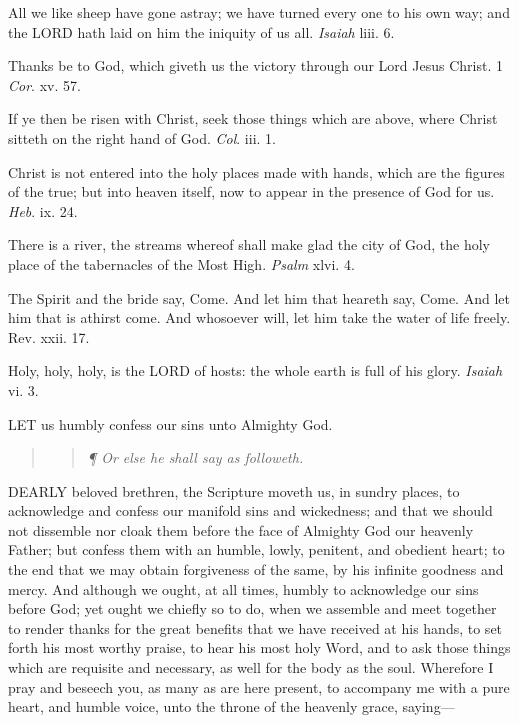 All
we like sheep have gone astray; we have turned every one to his own way;
and the LORD hath laid on him the iniquity of us
all. \emph{Isaiah} liii. 6.

Thanks be to God, which giveth us the victory through our Lord Jesus Christ.
1 \emph{Cor}. xv. 57.

If ye then be risen with Christ, seek those things
which are above, where Christ sitteth on the right hand of God. \emph{Col}.
iii. 1. 

Christ is not entered into the holy places made with hands, which are
the figures of the true; but into heaven itself, now to appear in the
presence of God for us. \emph{Heb}. ix. 24.

There is a river, the streams whereof shall make glad the city of God,
the holy place of the tabernacles of the Most High. \emph{Psalm}
xlvi. 4. 

The
Spirit and the bride say, Come. And let him that heareth say, Come. And
let him that is athirst come. And whosoever will, let him take the water
of life freely. Rev. xxii. 17.

Holy, holy, holy, is the LORD of hosts: the whole
earth is full of his glory. \emph{Isaiah} vi. 3.

LET
us humbly confess our sins unto Almighty God.

\begin{quote}

\begin{quote}

\emph{¶
Or else he shall say as followeth.}

\end{quote}

\end{quote}

DEARLY
beloved brethren, the Scripture moveth us, in sundry places, to acknowledge
and confess our manifold sins and wickedness; and that we should not dissemble
nor cloak them before the face of Almighty God our heavenly Father; but
confess them with an humble, lowly, penitent, and obedient heart; to the
end that we may obtain forgiveness of the same, by his infinite goodness
and mercy. And although we ought, at all times, humbly to acknowledge
our sins before God; yet ought we chiefly so to do, when we assemble and
meet together to render thanks for the great benefits that we have received
at his hands, to set forth his most worthy praise, to hear his most holy
Word, and to ask those things which are requisite and necessary, as well
for the body as the soul. Wherefore I pray and beseech you, as many as
are here present, to accompany me with a pure heart, and humble voice,
unto the throne of the heavenly grace, saying—


